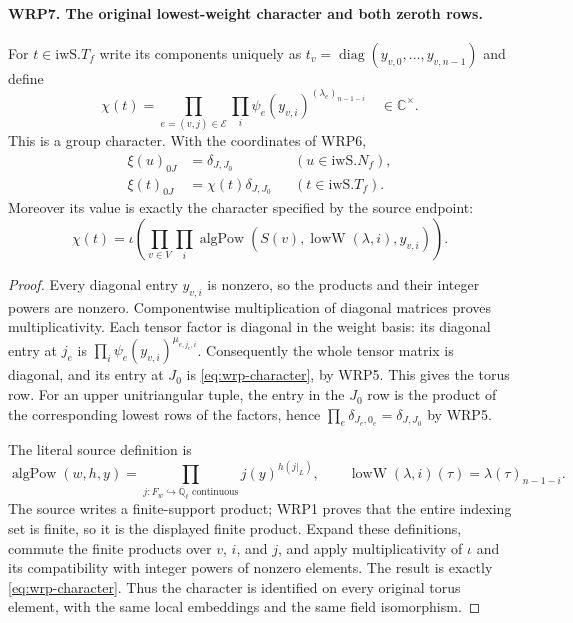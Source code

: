 \paragraph{WRP7. The original lowest-weight character and both zeroth rows.}
\label{claim:WRP7}
For $t\in\mathrm{iwS}.T_f$ write its components uniquely as
$t_v=\operatorname{diag}(y_{v,0},\ldots,y_{v,n-1})$ and define
\begin{equation}\label{eq:wrp-character}
 \chi(t)=\prod_{e=(v,j)\in\mathcal E}\prod_i
                  \psi_e(y_{v,i})^{(\lambda_e)_{n-1-i}}
                  \quad\in\mathbb C^\times.
\end{equation}
This is a group character.  With the coordinates of WRP6,
\begin{align}
 \xi(u)_{0J}&=\delta_{J,J_0} &&(u\in\mathrm{iwS}.N_f),\\
 \xi(t)_{0J}&=\chi(t)\delta_{J,J_0}
                                      &&(t\in\mathrm{iwS}.T_f).
 \label{eq:wrp-rows}
\end{align}
Moreover its value is exactly the character specified by
the source endpoint:
\begin{equation}\label{eq:wrp-lowW}
 \chi(t)=\iota\left(\prod_{v\in V}\prod_i
     \operatorname{algPow}(S(v),\operatorname{lowW}(\lambda,i),
                                                       y_{v,i})\right).
\end{equation}
\begin{proof}
Every diagonal entry $y_{v,i}$ is nonzero, so the products
and their integer powers are nonzero.  Componentwise
multiplication of diagonal matrices proves multiplicativity.
Each tensor factor is diagonal in the weight basis: its
diagonal entry at $j_e$ is
$\prod_i\psi_e(y_{v,i})^{\mu_{e,j_e,i}}$.  Consequently
the whole tensor matrix is diagonal, and its entry at
$J_0$ is \eqref{eq:wrp-character}, by WRP5.  This gives
the torus row.  For an upper unitriangular tuple, the entry
in the $J_0$ row is the product of the corresponding lowest
rows of the factors, hence
$\prod_e\delta_{J_e,0_e}=\delta_{J,J_0}$ by WRP5.

The literal source definition is
\[
 \operatorname{algPow}(w,h,y)=
       \prod_{j:F_w\hookrightarrow\overline{\mathbb Q}_\ell
                         \text{ continuous}} j(y)^{h(j|_L)},
 \qquad
 \operatorname{lowW}(\lambda,i)(\tau)=\lambda(\tau)_{n-1-i}.
\]
The source writes a finite-support product; WRP1 proves that
the entire indexing set is finite, so it is the displayed
finite product.  Expand these definitions, commute the finite
products over $v$, $i$, and $j$, and apply multiplicativity
of $\iota$ and its compatibility with integer powers of
nonzero elements.  The result is exactly
\eqref{eq:wrp-character}.  Thus the character is identified
on every original torus element, with the same local
embeddings and the same field isomorphism.
\end{proof}


